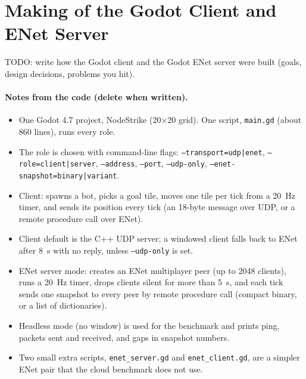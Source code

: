 \section{Making of the Godot Client and ENet Server}
TODO: write how the Godot client and the Godot ENet server were built (goals, design decisions, problems you hit).

\paragraph{Notes from the code (delete when written).}
\begin{itemize}
\item One Godot 4.7 project, NodeStrike (20×20 grid). One script, \texttt{main.gd} (about 860 lines), runs every role.
\item The role is chosen with command-line flags: \texttt{--transport=udp|enet}, \texttt{--role=client|server}, \texttt{--address}, \texttt{--port}, \texttt{--udp-only}, \texttt{--enet-snapshot=binary|variant}.
\item Client: spawns a bot, picks a goal tile, moves one tile per tick from a 20~Hz timer, and sends its position every tick (an 18-byte message over UDP, or a remote procedure call over ENet).
\item Client default is the C++ UDP server; a windowed client falls back to ENet after 8~s with no reply, unless \texttt{--udp-only} is set.
\item ENet server mode: creates an ENet multiplayer peer (up to 2048 clients), runs a 20~Hz timer, drops clients silent for more than 5~s, and each tick sends one snapshot to every peer by remote procedure call (compact binary, or a list of dictionaries).
\item Headless mode (no window) is used for the benchmark and prints ping, packets sent and received, and gaps in snapshot numbers.
\item Two small extra scripts, \texttt{enet\_server.gd} and \texttt{enet\_client.gd}, are a simpler ENet pair that the cloud benchmark does not use.
\end{itemize}

